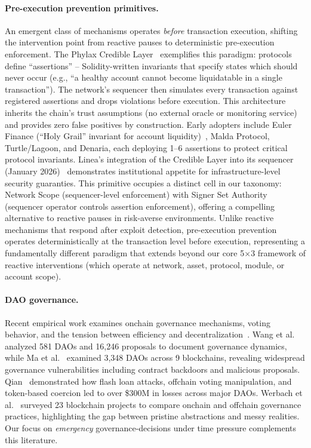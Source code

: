 \documentclass[12pt]{article}
\begin{document}
\paragraph{Pre-execution prevention primitives.}
\label{subsec:pre-execution-prevention-primitives}
An emergent class of mechanisms operates \emph{before} transaction execution, shifting the intervention point from reactive pauses to deterministic pre-execution enforcement. The Phylax Credible Layer~\cite{PhylaxCredibleLayer2026} exemplifies this paradigm: protocols define ``assertions'' -- Solidity-written invariants that specify states which should never occur (e.g., ``a healthy account cannot become liquidatable in a single transaction''). The network's sequencer then simulates every transaction against registered assertions and drops violations before execution. This architecture inherits the chain's trust assumptions (no external oracle or monitoring service) and provides zero false positives by construction. Early adopters include Euler Finance (``Holy Grail'' invariant for account liquidity)~\cite{PhylaxEulerAssertions2026}, Malda Protocol, Turtle/Lagoon, and Denaria, each deploying 1--6 assertions to protect critical protocol invariants. 
Linea's integration of the Credible Layer into its sequencer (January 2026)~\cite{PhylaxCredibleLayer2026} demonstrates institutional appetite for infrastructure-level security guaranties. 
This primitive occupies a distinct cell in our taxonomy: Network Scope (sequencer-level enforcement) with Signer Set Authority (sequencer operator controls assertion enforcement), offering a compelling alternative to reactive pauses in risk-averse environments. Unlike reactive mechanisms that respond after exploit detection, pre-execution prevention operates deterministically at the transaction level before execution, representing a fundamentally different paradigm that extends beyond our core 5$\times$3 framework of reactive interventions (which operate at network, asset, protocol, module, or account scope).

\paragraph{DAO governance.}
Recent empirical work examines onchain governance mechanisms, voting behavior, and the tension between efficiency and decentralization~\cite{Wang2025DAOempirical,Ma2025DAOsecurity,Werbach2024BlockchainGovernance}. Wang et al.~\cite{Wang2025DAOempirical} analyzed 581 DAOs and 16,246 proposals to document governance dynamics, while Ma et al.~\cite{Ma2025DAOsecurity} examined 3,348 DAOs across 9 blockchains, revealing widespread governance vulnerabilities including contract backdoors and malicious proposals. Qian~\cite{Qian2025DAOgovernance} demonstrated how flash loan attacks, offchain voting manipulation, and token-based coercion led to over \$300M in losses across major DAOs. Werbach et al.~\cite{Werbach2024BlockchainGovernance} surveyed 23 blockchain projects to compare onchain and offchain governance practices, highlighting the gap between pristine abstractions and messy realities. Our focus on \emph{emergency} governance-decisions under time pressure complements this literature.
\end{document}
